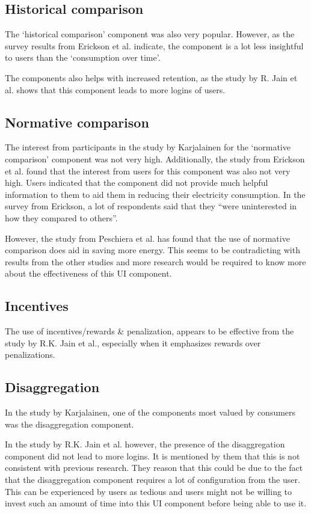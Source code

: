 \documentclass[journal]{vgtc}                %
\begin{document}
\subsection{Historical comparison}
The `historical comparison' component was also very popular. However, as the survey results from Erickson et al. indicate, the component is a lot less insightful to users than the `consumption over time'. 

The components also helps with increased retention, as the study by R. Jain et al. shows that this component leads to more logins of users.
\subsection{Normative comparison}
The interest from participants in the study by Karjalainen for the `normative comparison' component was not very high. 
Additionally, the study from Erickson et al. found that the interest from users for this component was also not very high. Users indicated that the component did not provide much helpful information to them to aid them in reducing their electricity consumption. In the survey from Erickson, a lot of respondents said that they ``were uninterested in how they compared to others''.

However, the study from Peschiera et al. has found that the use of normative comparison does aid in saving more energy. This seems to be contradicting with results from the other studies and more research would be required to know more about the effectiveness of this UI component.
\subsection{Incentives}
The use of incentives/rewards \& penalization, appears to be effective from the study by R.K. Jain et al., especially when it emphasizes rewards over penalizations. %

\subsection{Disaggregation}
In the study by Karjalainen, one of the components most valued by consumers was the disaggregation component. 

In the study by R.K. Jain et al. however, the presence of the disaggregation component did not lead to more logins. It is mentioned by them that this is not consistent with previous research. 
They reason that this could be due to the fact that the disaggregation component requires a lot of configuration from the user. This can be experienced by users as tedious and users might not be willing to invest such an amount of time into this UI component before being able to use it.
\end{document}
